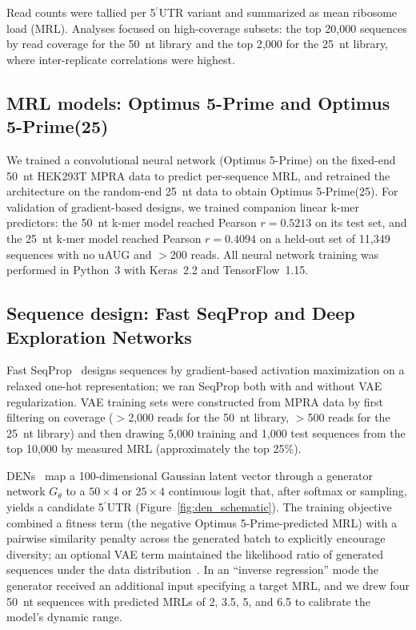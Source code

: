 \documentclass[11pt]{article}
\begin{document}
Read counts were tallied per 5$^\prime$UTR variant and summarized as
mean ribosome load (MRL). Analyses focused on high-coverage subsets:
the top 20{,}000 sequences by read coverage for the 50~nt library and
the top 2{,}000 for the 25~nt library, where inter-replicate
correlations were highest.

\subsection{MRL models: Optimus 5-Prime and Optimus 5-Prime(25)}

We trained a convolutional neural network (Optimus 5-Prime) on the
fixed-end 50~nt HEK293T MPRA data to predict per-sequence MRL, and
retrained the architecture on the random-end 25~nt data to obtain
Optimus 5-Prime(25). For validation of gradient-based designs, we
trained companion linear k-mer predictors: the 50~nt k-mer model
reached Pearson $r = 0.5213$ on its test set, and the 25~nt k-mer
model reached Pearson $r = 0.4094$ on a held-out set of 11{,}349
sequences with no uAUG and $>$200 reads. All neural network training
was performed in Python~3 with Keras~2.2 and TensorFlow~1.15.

\subsection{Sequence design: Fast SeqProp and Deep Exploration Networks}

Fast SeqProp~\citep{linder2021fastseqprop} designs sequences by
gradient-based activation maximization on a relaxed one-hot
representation; we ran SeqProp both with and without VAE regularization.
VAE training sets were constructed from MPRA data by first filtering
on coverage ($>$2{,}000 reads for the 50~nt library, $>$500 reads for
the 25~nt library) and then drawing 5{,}000 training and 1{,}000 test
sequences from the top 10{,}000 by measured MRL
(approximately the top 25\%).

DENs~\citep{linder2020den} map a 100-dimensional Gaussian latent vector
through a generator network $G_\theta$ to a $50\times4$ or $25\times4$
continuous logit that, after softmax or sampling, yields a candidate
5$^\prime$UTR (Figure~\ref{fig:den_schematic}). The training
objective combined a fitness term (the negative Optimus 5-Prime-predicted
MRL) with a pairwise similarity penalty across the generated batch to
explicitly encourage diversity; an optional VAE term maintained the
likelihood ratio of generated sequences under the data
distribution~\citep{linder2020den}. In an ``inverse regression'' mode
the generator received an additional input specifying a target MRL,
and we drew four 50~nt sequences with predicted MRLs of 2, 3.5, 5,
and 6.5 to calibrate the model's dynamic range.
\end{document}
